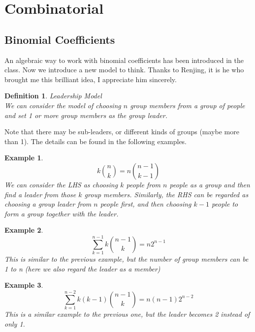 \documentclass{article}
\newtheorem{definition}{Definition}[section]
\newtheorem{example}{Example}[section]
\begin{document}
    \section{Combinatorial}
    \subsection{Binomial Coefficients}
    An algebraic way to work with binomial coefficients has been introduced in the class. Now we introduce a new model to think. Thanks to Renjing, it is he who brought me this brilliant idea, I appreciate him sincerely.
    \begin{definition}
        Leadership Model\\
        We can consider the model of choosing $n$ group members from a group of people and set 1 or more group members as the group leader.
    \end{definition}
    Note that there may be sub-leaders, or different kinds of groups (maybe more than 1). The details can be found in the following examples.

    \begin{example}
        \begin{equation}
            k\binom{n}{k}=n\binom{n-1}{k-1}
        \end{equation}
        We can consider the LHS as choosing $k$ people from $n$ people as a group and then find a leader from those $k$ group members. Similarly, the RHS can be regarded as choosing a group leader from $n$ people first, and then choosing $k-1$ people to form a group together with the leader.
    \end{example}

    \begin{example}
        \begin{equation}
            \sum^{n-1}_{k=1}k\binom{n-1}{k}=n2^{n-1}
        \end{equation}
        This is similar to the previous example, but the number of group members can be 1 to n (here we also regard the leader as a member)
    \end{example}

    \begin{example}
        \begin{equation}
            \sum^{n-2}_{k=1}k(k-1)\binom{n-1}{k}=n(n-1)2^{n-2}
        \end{equation}
        This is a similar example to the previous one, but the leader becomes 2 instead of only 1.
    \end{example}
    
\end{document}
